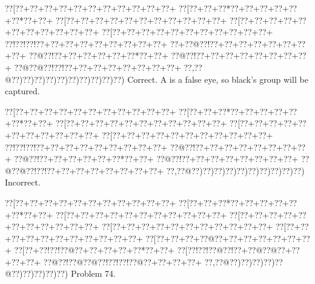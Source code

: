 \documentclass[a5paper]{article}
\begin{document}
\begin{center}
{\goo
\0??[\0??+\0??+\0??+\0??+\0??+\0??+\0??+\0??+\0??+\0??+\0??+
\0??[\0??+\0??+\0??*\0??+\0??+\0??+\0??+\0??+\0??*\0??+\0??+
\0??[\0??+\0??+\0??+\0??+\0??+\0??+\0??+\0??+\0??+\0??+\0??+
\0??[\0??+\0??+\0??+\0??+\0??+\0??+\0??+\0??+\0??+\0??+\0??+
\0??[\0??+\0??+\0??+\0??+\0??+\0??+\0??+\0??+\0??+\0??+\0??+
\0??!\0??!\0??!\0??+\0??+\0??+\0??+\0??+\0??+\0??+\0??+\0??+
\0??+\0??@\0??!\0??+\0??+\0??+\0??+\0??+\0??+\0??+\0??+
\0??@\0??!\0??+\0??+\0??+\0??+\0??+\0??*\0??+\0??+
\0??@\0??!\0??+\0??+\0??+\0??+\0??+\0??+\0??+\0??+
\0??@\0??@\0??!\0??!\0??+\0??+\0??+\0??+\0??+\0??+\0??+\0??+
\0??,\0??@\0??)\0??)\0??)\0??)\0??)\0??)\0??)\0??)\0??)\0??)
}
Correct. A is a false eye, so black's group will be captured.

\end{center}
\begin{center}
{\goo
\0??[\0??+\0??+\0??+\0??+\0??+\0??+\0??+\0??+\0??+\0??+\0??+
\0??[\0??+\0??+\0??*\0??+\0??+\0??+\0??+\0??+\0??*\0??+\0??+
\0??[\0??+\0??+\0??+\0??+\0??+\0??+\0??+\0??+\0??+\0??+\0??+
\0??[\0??+\0??+\0??+\0??+\0??+\0??+\0??+\0??+\0??+\0??+\0??+
\0??[\0??+\0??+\0??+\0??+\0??+\0??+\0??+\0??+\0??+\0??+\0??+
\0??!\0??!\0??!\0??+\0??+\0??+\0??+\0??+\0??+\0??+\0??+\0??+
\0??@\0??!\0??+\0??+\0??+\0??+\0??+\0??+\0??+\0??+
\0??@\0??!\0??+\0??+\0??+\0??+\0??+\0??*\0??+\0??+
\0??@\0??!\0??+\0??+\0??+\0??+\0??+\0??+\0??+\0??+
\0??@\0??@\0??!\0??!\0??+\0??+\0??+\0??+\0??+\0??+\0??+\0??+
\0??,\0??@\0??)\0??)\0??)\0??)\0??)\0??)\0??)\0??)\0??)\0??)
}
Incorrect. 

\end{center}
\newpage
\begin{center}
{\goo
\0??[\0??+\0??+\0??+\0??+\0??+\0??+\0??+\0??+\0??+\0??+\0??+
\0??[\0??+\0??+\0??*\0??+\0??+\0??+\0??+\0??+\0??*\0??+\0??+
\0??[\0??+\0??+\0??+\0??+\0??+\0??+\0??+\0??+\0??+\0??+\0??+
\0??[\0??+\0??+\0??+\0??+\0??+\0??+\0??+\0??+\0??+\0??+\0??+
\0??[\0??+\0??+\0??+\0??+\0??+\0??+\0??+\0??+\0??+\0??+\0??+
\0??[\0??+\0??+\0??+\0??+\0??+\0??+\0??+\0??+\0??+\0??+\0??+
\0??[\0??+\0??+\0??+\0??@\0??+\0??+\0??+\0??+\0??+\0??+\0??+
\0??[\0??+\0??!\0??!\0??@\0??+\0??+\0??+\0??+\0??*\0??+\0??+
\0??[\0??!\0??!\0??@\0??!\0??+\0??@\0??@\0??+\0??+\0??+\0??+
\0??@\0??!\0??@\0??@\0??!\0??!\0??!\0??@\0??+\0??+\0??+\0??+
\0??,\0??@\0??)\0??)\0??)\0??)\0??@\0??)\0??)\0??)\0??)\0??)
}
Problem 74.

\end{center}
\end{document}
